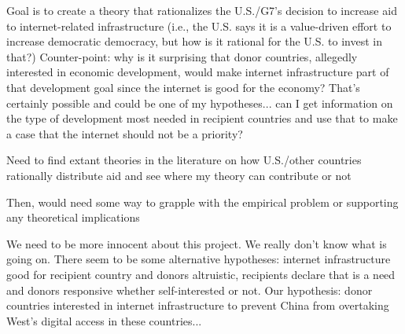 Goal is to create a theory that rationalizes the U.S./G7's decision to increase aid to internet-related infrastructure (i.e., the U.S. says it is a value-driven effort to increase democratic democracy, but how is it rational for the U.S. to invest in that?) Counter-point: why is it surprising that donor countries, allegedly interested in economic development, would make internet infrastructure part of that development goal since the internet is good for the economy? That's certainly possible and could be one of my hypotheses... can I get information on the type of development most needed in recipient countries and use that to make a case that the internet should not be a priority?

Need to find extant theories in the literature on how U.S./other countries rationally distribute aid and see where my theory can contribute or not

Then, would need some way to grapple with the empirical problem or supporting any theoretical implications

We need to be more innocent about this project. We really don't know what is going on. There seem to be some alternative hypotheses: internet infrastructure good for recipient country and donors altruistic, recipients declare that is a need and donors responsive whether self-interested or not. Our hypothesis: donor countries interested in internet infrastructure to prevent China from overtaking West's digital access in these countries...
